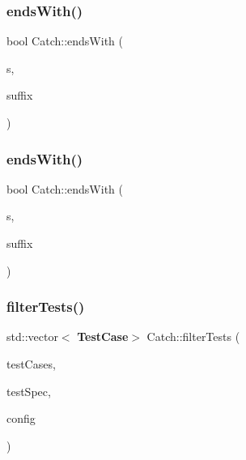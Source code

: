 \mbox{\label{namespace_catch_ada025504f627feaf9ac68ca391515dff}} 
\subsubsection{ends\+With()\hspace{0.1cm}{\footnotesize\ttfamily [1/2]}}
{\footnotesize\ttfamily bool Catch\+::ends\+With (\begin{DoxyParamCaption}\item[{std\+::string const \&}]{s,  }\item[{std\+::string const \&}]{suffix }\end{DoxyParamCaption})}

\mbox{\label{namespace_catch_afd801a3e33fd7a8b91ded0d02747a93f}} 
\subsubsection{ends\+With()\hspace{0.1cm}{\footnotesize\ttfamily [2/2]}}
{\footnotesize\ttfamily bool Catch\+::ends\+With (\begin{DoxyParamCaption}\item[{std\+::string const \&}]{s,  }\item[{char}]{suffix }\end{DoxyParamCaption})}

\mbox{\label{namespace_catch_ab5da9aa67c42a3f626aea07d0b556829}} 
\subsubsection{filter\+Tests()}
{\footnotesize\ttfamily std\+::vector$<$\textbf{ Test\+Case}$>$ Catch\+::filter\+Tests (\begin{DoxyParamCaption}\item[{std\+::vector$<$ \textbf{ Test\+Case} $>$ const \&}]{test\+Cases,  }\item[{Test\+Spec const \&}]{test\+Spec,  }\item[{I\+Config const \&}]{config }\end{DoxyParamCaption})}

\mbox{\label{namespace_catch_a1c9b1a23bc947ea70ddaabf067276cf2}} 
